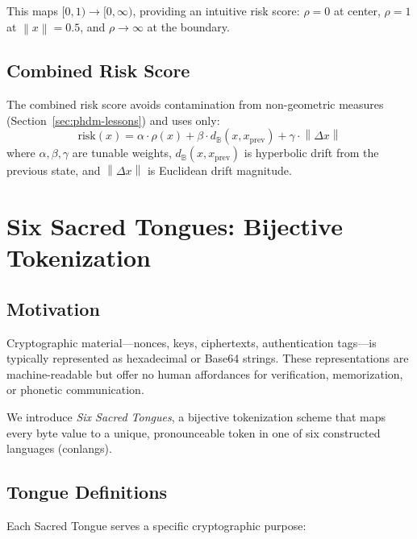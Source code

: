 \documentclass[11pt,a4paper]{article}
\newcommand{\BB}{\mathbb{B}}
\newcommand{\norm}[1]{\left\|#1\right\|}
\begin{document}
This maps $[0, 1) \to [0, \infty)$, providing an intuitive risk score:
$\rho = 0$ at center, $\rho = 1$ at $\norm{x} = 0.5$, and $\rho \to \infty$
at the boundary.

\subsection{Combined Risk Score}

The combined risk score avoids contamination from non-geometric measures
(Section~\ref{sec:phdm-lessons}) and uses only:
\begin{equation}
  \text{risk}(x) = \alpha \cdot \rho(x) + \beta \cdot d_\BB(x, x_{\text{prev}})
  + \gamma \cdot \norm{\Delta x}
\end{equation}
where $\alpha, \beta, \gamma$ are tunable weights, $d_\BB(x, x_{\text{prev}})$
is hyperbolic drift from the previous state, and $\norm{\Delta x}$ is
Euclidean drift magnitude.

\section{Six Sacred Tongues: Bijective Tokenization}
\label{sec:tongues}

\subsection{Motivation}

Cryptographic material---nonces, keys, ciphertexts, authentication
tags---is typically represented as hexadecimal or Base64 strings.
These representations are machine-readable but offer no human
affordances for verification, memorization, or phonetic communication.

We introduce \emph{Six Sacred Tongues}, a bijective tokenization
scheme that maps every byte value to a unique, pronounceable token
in one of six constructed languages (conlangs).

\subsection{Tongue Definitions}

Each Sacred Tongue serves a specific cryptographic purpose:
\end{document}
